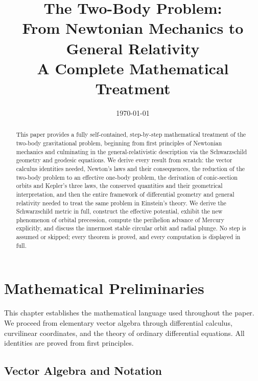 \documentclass[12pt,a4paper]{article}
\title{%
  \LARGE\bfseries The Two-Body Problem:\\
  From Newtonian Mechanics to General Relativity\\[1em]
  \large A Complete Mathematical Treatment
}
\author{}
\date{\today}
\theoremstyle{plain}
\theoremstyle{definition}
\theoremstyle{remark}
\begin{document}

\maketitle
\thispagestyle{empty}

\begin{abstract}
This paper provides a fully self-contained, step-by-step mathematical treatment of the two-body gravitational problem, beginning from first principles of Newtonian mechanics and culminating in the general-relativistic description via the Schwarzschild geometry and geodesic equations. We derive every result from scratch: the vector calculus identities needed, Newton's laws and their consequences, the reduction of the two-body problem to an effective one-body problem, the derivation of conic-section orbits and Kepler's three laws, the conserved quantities and their geometrical interpretation, and then the entire framework of differential geometry and general relativity needed to treat the same problem in Einstein's theory. We derive the Schwarzschild metric in full, construct the effective potential, exhibit the new phenomenon of orbital precession, compute the perihelion advance of Mercury explicitly, and discuss the innermost stable circular orbit and radial plunge. No step is assumed or skipped; every theorem is proved, and every computation is displayed in full.
\end{abstract}

\vfill
\tableofcontents
\vfill

\newpage
\setcounter{page}{1}

\section{Mathematical Preliminaries}

This chapter establishes the mathematical language used throughout the paper. We proceed from elementary vector algebra through differential calculus, curvilinear coordinates, and the theory of ordinary differential equations. All identities are proved from first principles.

\subsection{Vector Algebra and Notation}
\end{document}
